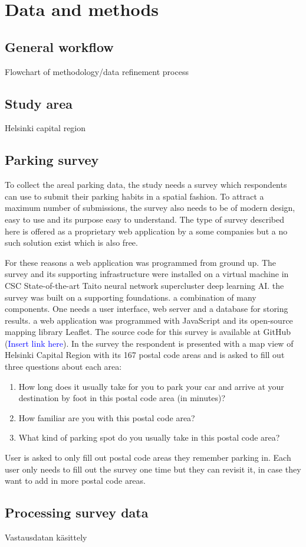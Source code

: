 \section{Data and methods}
\subsection{General workflow}
\justify
Flowchart of methodology/data refinement process

\subsection{Study area}
\justify
Helsinki capital region

\subsection{Parking survey}
\justify
To collect the areal parking data, the study needs a survey which respondents can use to submit their parking habits in a spatial fashion. To attract a maximum number of submissions, the survey also needs to be of modern design, easy to use and its purpose easy to understand. The type of survey described here is offered as a proprietary web application by a some companies but a no such solution exist which is also free. 

For these reasons a web application was programmed from ground up. The survey and its supporting infrastructure were installed on a virtual machine in CSC State-of-the-art Taito neural network supercluster deep learning AI.  the  survey was built on a supporting foundations. a combination of many components. One needs a user interface, web server and a database for storing results. a web application was programmed with JavaScript and its open-source mapping library Leaflet. The source code for this survey is available at GitHub (\textcolor{blue}{Insert link here}). In the survey the respondent is presented with a map view of Helsinki Capital Region with its 167 postal code areas and is asked to fill out three questions about each area: 
\begin{spacing}{1}
\begin{enumerate}
  \item How long does it usually take for you to park your car and arrive at your destination by foot in this postal code area (in minutes)?
  \item How familiar are you with this postal code area?
  \item What kind of parking spot do you usually take in this postal code area?
\end{enumerate}
\end{spacing}

\noindent
User is asked to only fill out postal code areas they remember parking in. Each user only needs to fill out the survey one time but they can revisit it, in case they want to add in more postal code areas.

\subsection{Processing survey data}
\justify
Vastausdatan käsittely